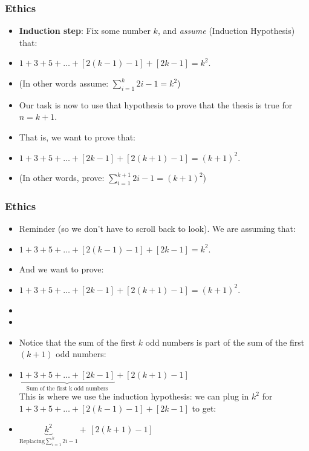 \begin{frame}
\frametitle{Ethics}

\begin{itemize}[<+->]
\item 

{\bf{Induction step}}: Fix some number $k$, and {\it{assume}} (Induction Hypothesis) that:

\item  $1+3+5+ \ldots + [2(k-1) - 1] + [2k - 1] = k^2$.
\item  
 (In other words assume:  $ \sum\limits_{i=1}^k 2i - 1 = k^2$)

\item Our task is now to use that hypothesis to prove that the thesis is true for $n = k+1$. 

\item That is, we want to prove that:

\item 
$1+3+5+ \ldots + [2k - 1] + [2(k+1) - 1] = (k+1)^2$.

\item (In other words, prove: $ \sum\limits_{i=1}^{k+1} 2i - 1 = (k+1)^2$)

\end{itemize} 
\end{frame}


\begin{frame}
\frametitle{Ethics}

\begin{itemize}[<+->]
\item 
Reminder (so we don't have to scroll back to look).
We are assuming that: 

\item  $1+3+5+ \ldots + [2(k-1) - 1] + [2k - 1] = k^2$.
\item  
And we want to prove:

\item $1+3+5+ \ldots + [2k - 1] + [2(k+1) - 1] = (k+1)^2$.

\item %

\item %

\item Notice that the sum of the first $k$ odd numbers is part of the sum of the first $(k+1)$ odd numbers:

\item $\underbrace{1+3+5+ \ldots + [2k - 1] }_{\text{Sum of the first k odd numbers}} +  [2(k+1) - 1]$\\[2ex]

This is where we use the induction hypothesis: we can plug in $k^2$ for $1+3+5+ \ldots + [2(k-1) - 1] + [2k - 1]$ to get:

\item $\underbrace{k^2}_{\text{Replacing}  \sum\limits_{i=1}^k 2i - 1} +\,  [2(k+1) - 1]$

\end{itemize} 
\end{frame}


